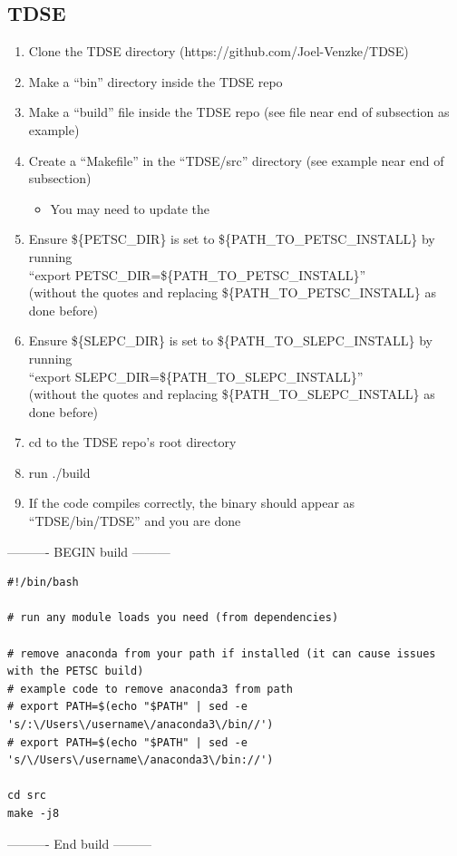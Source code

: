 \documentclass{article}
\begin{document}
\subsection{TDSE} %
\label{sub:tdse}
\begin{enumerate}
  \item Clone the TDSE directory (https://github.com/Joel-Venzke/TDSE)
  \item Make a ``bin'' directory inside the TDSE repo
  \item Make a ``build'' file inside the TDSE repo (see file near end of subsection as example)
  \item Create a ``Makefile'' in the ``TDSE/src'' directory (see example near end of subsection)
  \begin{itemize}
    \item You may need to update the 
  \end{itemize}
  \item Ensure \$\{PETSC\_DIR\} is set to \$\{PATH\_TO\_PETSC\_INSTALL\} by running \\``export PETSC\_DIR=\$\{PATH\_TO\_PETSC\_INSTALL\}'' \\(without the quotes and replacing \$\{PATH\_TO\_PETSC\_INSTALL\} as done before)
  \item Ensure \$\{SLEPC\_DIR\} is set to \$\{PATH\_TO\_SLEPC\_INSTALL\} by running \\``export SLEPC\_DIR=\$\{PATH\_TO\_SLEPC\_INSTALL\}'' \\(without the quotes and replacing \$\{PATH\_TO\_SLEPC\_INSTALL\} as done before)
  \item cd to the TDSE repo's root directory
  \item run ./build
  \item If the code compiles correctly, the binary should appear as ``TDSE/bin/TDSE'' and you are done
\end{enumerate}

---------- BEGIN build ---------
\begin{verbatim}
#!/bin/bash

# run any module loads you need (from dependencies)

# remove anaconda from your path if installed (it can cause issues with the PETSC build)
# example code to remove anaconda3 from path
# export PATH=$(echo "$PATH" | sed -e 's/:\/Users\/username\/anaconda3\/bin//')
# export PATH=$(echo "$PATH" | sed -e 's/\/Users\/username\/anaconda3\/bin://')

cd src
make -j8
\end{verbatim}
---------- End build ---------
\end{document}
